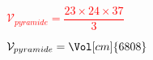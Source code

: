 \begin{corrige}
\begin{enumerate}
        \textcolor{red}{$\mathcal{V}_{pyramide}=\dfrac{\num{23}\times \num{24}\times \num{37}}{3}$}
        
        \textcolor{red}{$\mathcal{V}_{pyramide}=\Vol[cm]{6808}$}
    \end{enumerate}
\end{corrige}

